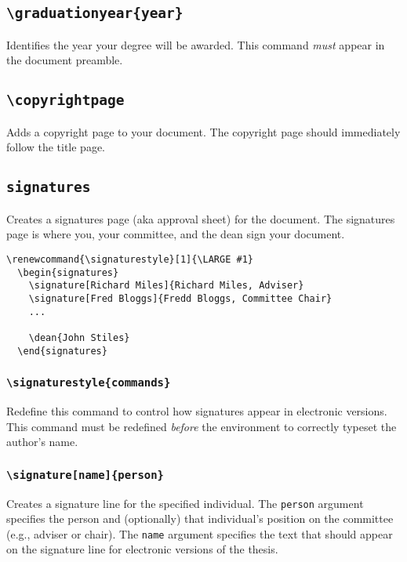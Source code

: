 \documentclass[10pt]{article}
\newcommand{\environment}[1]{\texttt{#1}}
\newcommand{\command}[1]{\texttt{\textbackslash#1}}
\newcommand{\argument}[1]{\texttt{#1}}
\begin{document}
\subsection{\command{graduationyear\{year\}}}
Identifies the year your degree will be awarded.
This command \emph{must} appear in the document preamble.

\subsection{\command{copyrightpage}}
Adds a copyright page to your document.
The copyright page should immediately follow the title page.

\subsection{\environment{signatures}}
Creates a signatures page (aka approval sheet) for the document.
The signatures page is where you, your committee, and the dean sign your document.

\begin{lstlisting}[gobble=2,float=h]
  \renewcommand{\signaturestyle}[1]{\LARGE #1}
  \begin{signatures}
    \signature[Richard Miles]{Richard Miles, Adviser}
    \signature[Fred Bloggs]{Fredd Bloggs, Committee Chair}
    ...
    
    \dean{John Stiles}
  \end{signatures}
\end{lstlisting}

\subsubsection{\command{signaturestyle\{commands\}}}
Redefine this command to control how signatures appear in electronic versions.
This command must be redefined \emph{before} the environment to correctly typeset the author's name.

\subsubsection{\command{signature[name]\{person\}}}
Creates a signature line for the specified individual.
The \argument{person} argument specifies the person and (optionally) that individual's position on the committee (e.g., adviser or chair).
The \argument{name} argument specifies the text that should appear on the signature line for electronic versions of the thesis.
\end{document}
